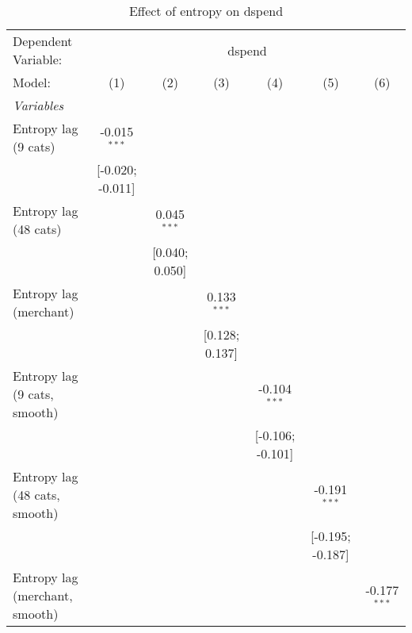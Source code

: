 
\begin{table}[htbp]
   \centering
   \tiny
   \begin{threeparttable}[b]
      \caption{\label{tab:reg_dspend_lag} Effect of entropy on dspend}
      \begin{tabular}{lcccccc}
         \tabularnewline \midrule \midrule
         Dependent Variable: & \multicolumn{6}{c}{dspend}\\
         Model:                         & (1)              & (2)            & (3)            & (4)              & (5)              & (6)\\  
         \midrule
         \emph{Variables}\\
         Entropy lag (9 cats)           & -0.015$^{***}$   &                &                &                  &                  &   \\   
                                        & [-0.020; -0.011] &                &                &                  &                  &   \\   
         Entropy lag (48 cats)          &                  & 0.045$^{***}$  &                &                  &                  &   \\   
                                        &                  & [0.040; 0.050] &                &                  &                  &   \\   
         Entropy lag (merchant)         &                  &                & 0.133$^{***}$  &                  &                  &   \\   
                                        &                  &                & [0.128; 0.137] &                  &                  &   \\   
         Entropy lag (9 cats, smooth)   &                  &                &                & -0.104$^{***}$   &                  &   \\   
                                        &                  &                &                & [-0.106; -0.101] &                  &   \\   
         Entropy lag (48 cats, smooth)  &                  &                &                &                  & -0.191$^{***}$   &   \\   
                                        &                  &                &                &                  & [-0.195; -0.187] &   \\   
         Entropy lag (merchant, smooth) &                  &                &                &                  &                  & -0.177$^{***}$\\   

\end{tabular}
\end{threeparttable}
\end{table}
